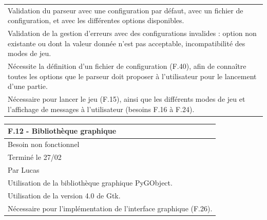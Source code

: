 \documentclass[a4paper,12pt]{article}
\begin{document}
\begin{tabularx}{\textwidth}{|X|}
    \arrayrulecolor{MediumAquamarine}\hline
    \arrayrulecolor{CornflowerBlue}
    Validation du parseur avec une configuration par défaut, avec un fichier de configuration, et avec les différentes options disponibles.                                         \\
    Validation de la gestion d’erreurs avec des configurations invalides : option non existante ou dont la valeur donnée n’est pas acceptable, incompatibilité des modes de jeu.    \\
    \arrayrulecolor{MediumAquamarine}\hline
    \arrayrulecolor{CornflowerBlue}
    Nécessite la définition d’un fichier de configuration (F.40), afin de connaître toutes les options que le parseur doit proposer à l’utilisateur pour le lancement d’une partie. \\
    Nécessaire pour lancer le jeu (F.15), ainsi que les différents modes de jeu et l’affichage de messages à l’utilisateur (besoins F.16 à F.24).                                   \\
    \hline
\end{tabularx}

\vspace{1cm}

\noindent
\setlength{\arrayrulewidth}{1.5pt}
\renewcommand{\arraystretch}{1.5}
\begin{tabularx}{\textwidth}{|X|}
    \hline
    \textbf{F.12 - Bibliothèque graphique}                            \\
    \hline
    Besoin non fonctionnel                                            \\
    \hline
    Terminé le 27/02                                                  \\
    Par Lucas                                                         \\
    \hline
    Utilisation de la bibliothèque graphique PyGObject.               \\
    Utilisation de la version 4.0 de Gtk.                             \\
    \hline
    \arrayrulecolor{RoyalBlue}
    Nécessaire pour l’implémentation de l’interface graphique (F.26). \\
    \hline
\end{tabularx}

\vspace{1cm}
\end{document}
